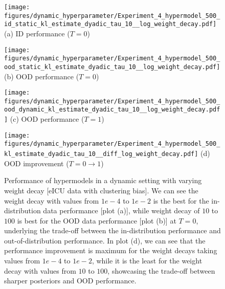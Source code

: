 \begin{figure}[h]
\centering
\begin{minipage}[b]{0.24\textwidth}
\centering
\texttt{[image: figures/dynamic\_hyperparameter/Experiment\_4\_hypermodel\_500\_id\_static\_kl\_estimate\_dyadic\_tau\_10\_\_log\_weight\_decay.pdf]}
{\small{{(a)} ID performance ($T=0$) }}
\end{minipage}
\hfill
\begin{minipage}[b]{0.24\textwidth}
\centering \texttt{[image: figures/dynamic\_hyperparameter/Experiment\_4\_hypermodel\_500\_ood\_static\_kl\_estimate\_dyadic\_tau\_10\_\_log\_weight\_decay.pdf]}
{\small{{(b)} OOD performance ($T=0$) }}
\end{minipage}
\hfill
\begin{minipage}[b]{0.24\textwidth}
\centering \texttt{[image: figures/dynamic\_hyperparameter/Experiment\_4\_hypermodel\_500\_ood\_dynamic\_kl\_estimate\_dyadic\_tau\_10\_\_log\_weight\_decay.pdf]}
{\small{{(c)} OOD performance ($T= 1$) }}
\end{minipage}
\hfill
\begin{minipage}[b]{0.24\textwidth}
\centering \texttt{[image: figures/dynamic\_hyperparameter/Experiment\_4\_hypermodel\_500\_kl\_estimate\_dyadic\_tau\_10\_\_diff\_log\_weight\_decay.pdf]}
{\small{{(d)} OOD improvement ($T=0 \to 1$) }}
\end{minipage}
\caption{Performance of hypermodels in a dynamic setting with varying weight decay [eICU data with clustering bias].
We can see the weight decay with values from $1e-4$ to $1e-2$ is the best for the in-distribution data performance [plot (a)], while weight decay of $10$ to $100$ is best for the OOD data performance [plot (b)] at $T=0$, underlying the trade-off between the in-distribution performance and out-of-distribution performance. In plot (d), we can see that the performance improvement is maximum for the weight decays taking values from $1e-4$ to $1e-2$, while it is the least for the weight decay with values from $10$ to $100$,  showcasing the trade-off between sharper posteriors and OOD performance. 
}
\label{fig:Hypermodel_weight_decay}
\end{figure}




